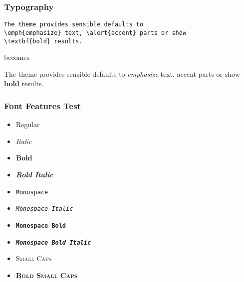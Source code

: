 \documentclass[10pt]{beamer}
\begin{document}
\begin{frame}[fragile]
  \frametitle{Typography}
  \begin{verbatim}The theme provides sensible defaults to
\emph{emphasize} text, \alert{accent} parts or show
\textbf{bold} results.\end{verbatim}
  \begin{center}
    becomes
  \end{center}
  The theme provides sensible defaults to \emph{emphasize} text,
  \alert{accent} parts or show \textbf{bold} results.
\end{frame}

\begin{frame}
  \frametitle{Font Features Test}
  \begin{itemize}
    \item Regular
    \item \textit{Italic}
    \item \textbf{Bold}
    \item \textbf{\textit{Bold Italic}}
    \item \texttt{Monospace}
    \item \texttt{\textit{Monospace Italic}}
    \item \texttt{\textbf{Monospace Bold}}
    \item \texttt{\textbf{\textit{Monospace Bold Italic}}}
    \item \textsc{Small Caps}
    \item \textbf{\textsc{Bold Small Caps}}
  \end{itemize}
\end{frame}
\end{document}
